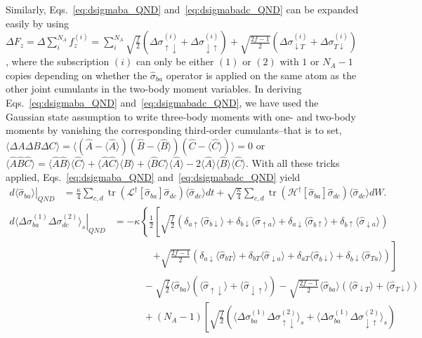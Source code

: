 \documentclass[preprint,aps,pra,onecolumn,superscriptaddress]{revtex4-1} %
\DeclareMathOperator{\tr}{tr}
\newcommand{\nn}{\nonumber}
\newcommand{\expect}[1]{\big\langle #1 \big\rangle}
\begin{document}
\begin{appendix}
Similarly, Eqs.~\eqref{eq:dsigmaba_QND} and~\eqref{eq:dsigmabadc_QND} can be expanded easily by using $ \Delta F_z=\Delta \sum_i^{N_A} f_z^{(i)}=\sum_i^{N_A} \sqrt{\frac{f}{2}}(\Delta\sigma_{\uparrow\downarrow}^{(i)}+\Delta\sigma_{\downarrow\uparrow}^{(i)}) + \sqrt{\frac{2f-1}{2}}(\Delta \sigma_{\downarrow T}^{(i)}+\Delta\sigma_{T\downarrow}^{(i)}) $, where the subscription $ (i) $ can only be either $ (1) $ or $ (2) $ with $ 1 $ or $ N_A-1 $ copies depending on whether the $ \hat{\sigma}_{ba} $ operator is applied on the same atom as the other joint cumulants in the two-body moment variables. In deriving Eqs.~\eqref{eq:dsigmaba_QND} and~\eqref{eq:dsigmabadc_QND}, we have used the Gaussian state assumption to write three-body moments with one- and two-body moments by vanishing the corresponding third-order cumulants--that is to set, $ \expect{\Delta A\Delta B\Delta C }=\expect{(\hat{A}-\expect{\hat{A}} )(\hat{B}-\expect{\hat{B}})(\hat{C}-\expect{\hat{C}}) } =0$ or $ \expect{\hat{A}\hat{B}\hat{C}}=\expect{\hat{A}\hat{B}}\expect{\hat{C}}+ \expect{\hat{A}\hat{C} }\expect{\hat{B}}+\expect{\hat{B}\hat{C} }\expect{\hat{A}}-2\expect{\hat{A}}\expect{\hat{B}}\expect{\hat{C}} $. With all these tricks applied, Eqs.~\eqref{eq:dsigmaba_QND} and~\eqref{eq:dsigmabadc_QND} yield
\begin{align}\label{eq:dsigmaba_QND_expand}
\left.d\expect{\hat{\sigma}_{ba}}\right|_{QND} &=\frac{\kappa}{4}\sum_{c,d}\tr\left(\mathcal{L}^\dagger\left[\hat{\sigma}_{ba} \right]\hat{\sigma}_{dc}\right) \expect{\hat{\sigma}_{dc}}dt + \sqrt{\frac{\kappa}{4}}\sum_{c,d}\tr\left(\mathcal{H}^\dagger\left[\hat{\sigma}_{ba} \right]\hat{\sigma}_{dc}\right) \expect{\hat{\sigma}_{dc}}dW .
\end{align}
\begin{align}
\left.d\expect{\!\Delta \sigma_{ba}^{(\!1\!)}\! \Delta \sigma_{dc}^{(\!2\!)}}_s \right|_{QND} 
&\!\!= -\kappa\left\{\frac{1}{2}\left[ \sqrt{\frac{f}{2}}\left(\delta_{a\uparrow}\expect{\hat{\sigma}_{b\downarrow}}+ \delta_{b\downarrow}\expect{\hat{\sigma}_{\uparrow a}}+\delta_{a\downarrow}\expect{\hat{\sigma}_{b\uparrow}} +\delta_{b\uparrow}\expect{\hat{\sigma}_{\downarrow a} } \right)\right.\right.\nn\\
&\quad\quad\quad\quad\left. +\sqrt{\frac{2f-1}{2}}\left(\delta_{a\downarrow}\expect{\hat{\sigma}_{bT}} + \delta_{bT}\expect{\hat{\sigma}_{\downarrow a} }+\delta_{aT}\expect{\hat{\sigma}_{b\downarrow} } +\delta_{b\downarrow}\expect{\hat{\sigma}_{Ta} } \right)\right] \nn\\
&\quad\quad\quad -\sqrt{\frac{f}{2}}\expect{\hat{\sigma}_{ba} }\left(\expect{\hat{\sigma}_{\uparrow\downarrow} }+\expect{\hat{\sigma}_{\downarrow\uparrow} } \right) -\sqrt{\frac{2f-1}{2}} \expect{\hat{\sigma}_{ba}}\left(\expect{\hat{\sigma}_{\downarrow T}}+\expect{\hat{\sigma}_{T\downarrow}} \right)\nn\\ &\quad\quad\quad+(N_A-1)\left[\sqrt{\frac{f}{2}}\left(\expect{\Delta \sigma^{(1)}_{ba}  \Delta\sigma_{\uparrow\downarrow}^{(2)}}_s \!+\!\expect{\Delta\sigma_{ba}^{(1)}\Delta\sigma_{\downarrow\uparrow}^{(2)}}_s\right)\right.\nn\\

\end{align}
\end{appendix}
\end{document}
